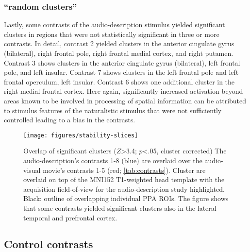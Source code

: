 \documentclass[english]{article}
\begin{document}
\subsubsection{``random clusters''}

%
Lastly, some contrasts of the audio-description stimulus yielded significant
clusters in regions that were not statistically significant in three or more
contrasts.
In detail, contrast 2 yielded clusters in the anterior cingulate gyrus
(bilateral), right frontal pole, right frontal medial cortex, and right putamen.
%
Contrast 3 shows clusters in the anterior cingulate gyrus (bilateral), left
frontal pole, and left insular.
%
Contrast 7 shows clusters in the left frontal pole and left frontal operculum,
left insular.
%
Contrast 6 shows one additional cluster in the right medial frontal cortex.
Here again, significantly increased activation beyond areas known to be involved
in processing of spatial information can be attributed to stimulus features of
the naturalistic stimulus that were not sufficiently controlled leading to a
bias in the contrasts.


\begin{figure*}[tbp]
\centering
    \texttt{[image: figures/stability-slices]}
    \caption{Overlap of significant clusters ($Z$>3.4; $p$<.05, cluster corrected)
        The audio-description's contrasts 1-8 (blue)
        are overlaid over the audio-visual movie's contrasts 1-5 (red;
        \ref{tab:contrasts}).
        Cluster are overlaid on top of the MNI152 T1-weighted head template
        with the acquisition field-of-view for the audio-description study
        highlighted.
        Black: outline of overlapping individual PPA ROIs.
        The figure shows that some contrasts yielded significant clusters
        also in the lateral temporal and prefrontal cortex.
        }
    \label{fig:stability-slices}
\end{figure*}


\subsection{Control contrasts}


\end{document}

